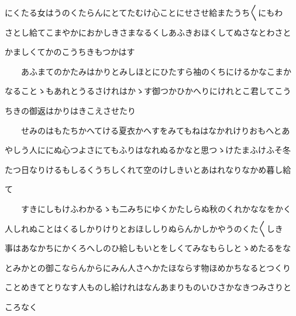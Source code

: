 \documentclass[a4paper,11pt,landscape]{ltjtarticle}
\begin{document}
にくたる女はうのくたらんにとてたむけ心ことにせさせ給またうち〱にもわ
\par\medskip
さとし給てこまやかにおかしきさまなるくしあふきおほくしてぬさなとわさと
\par\medskip
かましくてかのこうちきもつかはす
\par\medskip
　　あふまてのかたみはかりとみしほとにひたすら袖のくちにけるかなこまか
\par\medskip
なることゝもあれとうるさけれはかゝす御つかひかへりにけれとこ君してこう
\par\medskip
ちきの御返はかりはきこえさせたり
\par\medskip
　　せみのはもたちかへてける夏衣かへすをみてもねはなかれけりおもへとあ
\par\medskip
やしう人ににぬ心つよさにてもふりはなれぬるかなと思つゝけたまふけふそ冬
\par\medskip
たつ日なりけるもしるくうちしくれて空のけしきいとあはれなりなかめ暮し給
\par\medskip
て
\par\medskip
　　すきにしもけふわかるゝも二みちにゆくかたしらぬ秋のくれかななをかく
\par\medskip
人しれぬことはくるしかりけりとおほししりぬらんかしかやうのくた〱しき
\par\medskip
事はあなかちにかくろへしのひ給しもいとをしくてみなもらしとゝめたるをな
\par\medskip
とみかとの御こならんからにみん人さへかたほならす物ほめかちなるとつくり
\par\medskip
ことめきてとりなす人ものし給けれはなんあまりものいひさかなきつみさりと
\par\medskip
ころなく
\par\medskip
\end{document}
